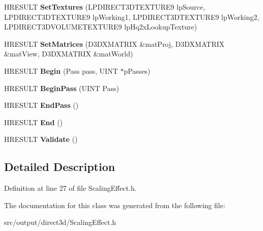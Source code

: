 \begin{DoxyCompactItemize}
\item 
\hypertarget{classScalingEffect_a8fc22e965dca8a951139bbfa0b11d916}{H\-R\-E\-S\-U\-L\-T {\bfseries Set\-Textures} (L\-P\-D\-I\-R\-E\-C\-T3\-D\-T\-E\-X\-T\-U\-R\-E9 lp\-Source, L\-P\-D\-I\-R\-E\-C\-T3\-D\-T\-E\-X\-T\-U\-R\-E9 lp\-Working1, L\-P\-D\-I\-R\-E\-C\-T3\-D\-T\-E\-X\-T\-U\-R\-E9 lp\-Working2, L\-P\-D\-I\-R\-E\-C\-T3\-D\-V\-O\-L\-U\-M\-E\-T\-E\-X\-T\-U\-R\-E9 lp\-Hq2x\-Lookup\-Texture)}\label{classScalingEffect_a8fc22e965dca8a951139bbfa0b11d916}

\item 
\hypertarget{classScalingEffect_a58e49c69fe364474ba44a4cd02feb4a5}{H\-R\-E\-S\-U\-L\-T {\bfseries Set\-Matrices} (D3\-D\-X\-M\-A\-T\-R\-I\-X \&mat\-Proj, D3\-D\-X\-M\-A\-T\-R\-I\-X \&mat\-View, D3\-D\-X\-M\-A\-T\-R\-I\-X \&mat\-World)}\label{classScalingEffect_a58e49c69fe364474ba44a4cd02feb4a5}

\item 
\hypertarget{classScalingEffect_a5bd1b4333487b834a56df0bb9e48e52d}{H\-R\-E\-S\-U\-L\-T {\bfseries Begin} (Pass pass, U\-I\-N\-T $\ast$p\-Passes)}\label{classScalingEffect_a5bd1b4333487b834a56df0bb9e48e52d}

\item 
\hypertarget{classScalingEffect_a05551a3f64c97941857564dfe79a76fd}{H\-R\-E\-S\-U\-L\-T {\bfseries Begin\-Pass} (U\-I\-N\-T Pass)}\label{classScalingEffect_a05551a3f64c97941857564dfe79a76fd}

\item 
\hypertarget{classScalingEffect_ae527ffe8a7d40e896b15826bf9e15cb3}{H\-R\-E\-S\-U\-L\-T {\bfseries End\-Pass} ()}\label{classScalingEffect_ae527ffe8a7d40e896b15826bf9e15cb3}

\item 
\hypertarget{classScalingEffect_a3a5913238563aa5b08f675578f63a11d}{H\-R\-E\-S\-U\-L\-T {\bfseries End} ()}\label{classScalingEffect_a3a5913238563aa5b08f675578f63a11d}

\item 
\hypertarget{classScalingEffect_a8177702bdcb050162a52c45c4feab52d}{H\-R\-E\-S\-U\-L\-T {\bfseries Validate} ()}\label{classScalingEffect_a8177702bdcb050162a52c45c4feab52d}

\end{DoxyCompactItemize}


\subsection{Detailed Description}


Definition at line 27 of file Scaling\-Effect.\-h.



The documentation for this class was generated from the following file\-:\begin{DoxyCompactItemize}
\item 
src/output/direct3d/Scaling\-Effect.\-h\end{DoxyCompactItemize}
